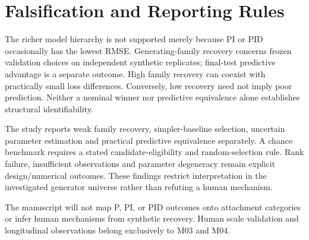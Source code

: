\section{Falsification and Reporting Rules}

The richer model hierarchy is not supported merely because PI or PID occasionally has the lowest RMSE. Generating-family recovery concerns frozen validation choices on independent synthetic replicates; final-test predictive advantage is a separate outcome. High family recovery can coexist with practically small loss differences. Conversely, low recovery need not imply poor prediction. Neither a nominal winner nor predictive equivalence alone establishes structural identifiability.

The study reports weak family recovery, simpler-baseline selection, uncertain parameter estimation and practical predictive equivalence separately. A chance benchmark requires a stated candidate-eligibility and random-selection rule. Rank failure, insufficient observations and parameter degeneracy remain explicit design/numerical outcomes. These findings restrict interpretation in the investigated generator universe rather than refuting a human mechanism.

The manuscript will not map P, PI, or PID outcomes onto attachment categories or infer human mechanisms from synthetic recovery. Human scale validation and longitudinal observations belong exclusively to M03 and M04.
